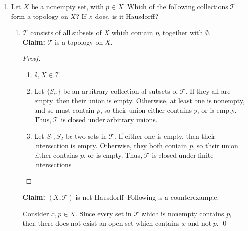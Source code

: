 \documentclass[letterpaper]{article}
\newcommand{\T}{\mathcal{T}}
\begin{document}
\begin{enumerate}
\begin{proof}
\begin{enumerate}[label=(\roman*)]
\item Let $S_1, S_2$ be two sets in $\T$. If either set does not contain 0, then their intersection does not either. If neither set contains 0, then they both must contain $(-1,1)$, since they are both in $\T$. So, their intersection also contains $(-1,1)$. Therefore, $\T$ is closed under finite intersections.
\end{enumerate}
\end{proof}

\item Let $X$ be a nonempty set, with $p \in X$. Which of the following collections $\T$ form a topology on $X$? If it does, is it Hausdorff?
\begin{enumerate}
\item $\T$ consists of all subsets of $X$ which contain $p$, together with $\emptyset$. \\
\textbf{Claim: }$\T$ is a topology on $X$. 
\begin{proof}\mbox{}
\begin{enumerate}[label=(\roman*)]
\item $\emptyset, X \in \T$
\item Let $\{S_\alpha\}$ be an arbitrary collection of subsets of $\T$. If they all are empty, then their union is empty. Otherwise, at least one is nonempty, and so must contain $p$, so their union either contains $p$, or is empty. Thus, $\T$ is closed under arbitrary unions.
\item Let $S_1, S_2$ be two sets in $\T$. If either one is empty, then their intersection is empty. Otherwise, they both contain $p$, so their union either contains $p$, or is empty. Thus, $\T$ is closed under finite intersections.
\end{enumerate}
\end{proof}
\pagebreak
\textbf{Claim: }$(X, \T)$ is not Hausdorff. Following is a counterexample:
\begin{example*}
Consider $x,p \in X$. Since every set in $\T$ which is nonempty contains $p$, then there does not exist an open set which contains $x$ and not $p$. \qed
\end{example*}


\end{enumerate}
\end{enumerate}
\end{document}
